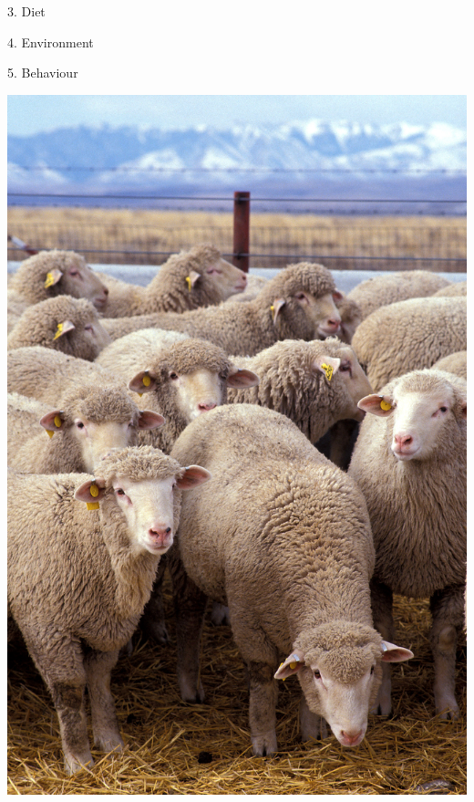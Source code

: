 \documentclass{beamer}
\begin{document}
    \begin{frame}
        \centering
        \Huge
        3. Diet
    \end{frame}

    \begin{frame}
        \centering
        \Huge
        4. Environment
    \end{frame}

    \begin{frame}
        \centering
        \Huge
        5. Behaviour
    \end{frame}

    \begin{frame}
        \centering
        \includegraphics[height=.95\textheight]{static/flock_of_sheep.jpg}
    \end{frame}
\end{document}
